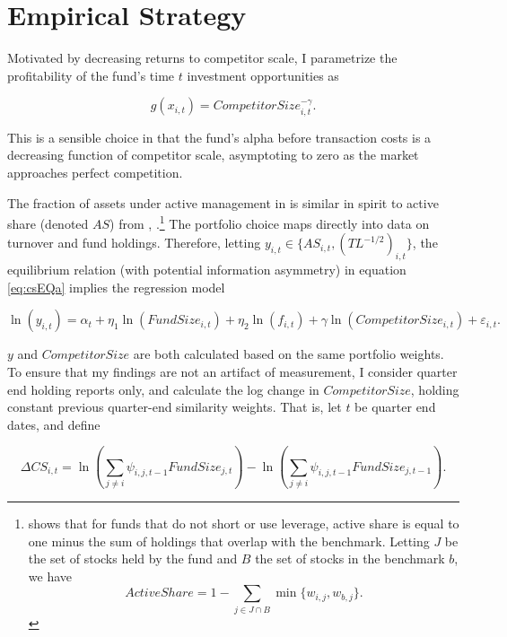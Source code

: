 \documentclass[openany]{book}
\let\rmarkdownfootnote\footnote%
\def\footnote{\protect\rmarkdownfootnote}
\theoremstyle{definition}
\theoremstyle{definition}
\theoremstyle{definition}
\theoremstyle{remark}
\begin{document}
\section{Empirical Strategy}\label{empirical-strategy}

Motivated by decreasing returns to competitor scale, I parametrize the
profitability of the fund's time \(t\) investment opportunities as

\begin{equation}
g(x_{i,t})=CompetitorSize_{i,t}^{-\gamma}. 
\label{eq:muParam}
\end{equation}

This is a sensible choice in that the fund's alpha before transaction
costs is a decreasing function of competitor scale, asymptoting to zero
as the market approaches perfect competition.

The fraction of assets under active management in \citet{bg04} is
similar in spirit to active share (denoted \(AS\)) from \citet{cp09},
\citet{petajisto13}.\footnote{\citet{cremers17} shows that for funds
  that do not short or use leverage, active share is equal to one minus
  the sum of holdings that overlap with the benchmark. Letting \(J\) be
  the set of stocks held by the fund and \(B\) the set of stocks in the
  benchmark \(b\), we have
  \[ ActiveShare=1-\sum_{j\in J\cap B} \min\{ w_{i,j},w_{b,j} \}.\]} The
\citet{pst17L} portfolio choice maps directly into data on turnover and
fund holdings. Therefore, letting
\(y_{i,t}\in\{AS_{i,t},\left(TL^{-1/2}\right)_{i,t}\}\), the equilibrium
relation (with potential information asymmetry) in equation
\eqref{eq:csEQa} implies the regression model

\begin{equation}
\ln(y_{i,t})=\alpha_t + \eta_1 \ln(FundSize_{i,t}) +\eta_2 \ln(f_{i,t}) + \gamma\ln(CompetitorSize_{i,t}) + \varepsilon_{i,t}.
\label{eq:regCS}
\end{equation}

\(y\) and \(CompetitorSize\) are both calculated based on the same
portfolio weights. To ensure that my findings are not an artifact of
measurement, I consider quarter end holding reports only, and calculate
the log change in \(CompetitorSize\), holding constant previous
quarter-end similarity weights. That is, let \(t\) be quarter end dates,
and define

\begin{equation}
\Delta CS_{i,t}=\ln \left(\sum_{j\neq i} \psi_{i,j,t-1} FundSize_{j,t}\right) - \ln \left(\sum_{j\neq i} \psi_{i,j,t-1} FundSize_{j,t-1}\right).
\end{equation}
\end{document}
